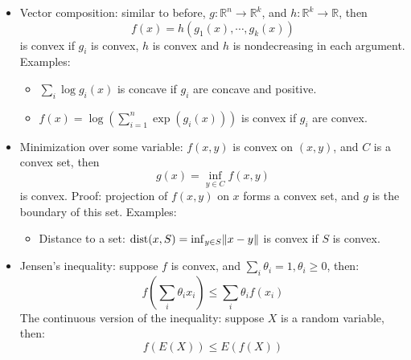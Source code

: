 \documentclass{report}
\begin{document}
\begin{itemize}
\item Vector composition: similar to before, $g: \mathbb{R}^n \rightarrow \mathbb{R}^k$, and $h: \mathbb{R}^k \rightarrow \mathbb{R}$, then
\begin{equation}
f(x) = h(g_1(x), \cdots, g_k(x))	
\end{equation}
is convex if $g_i$ is convex, $h$ is convex and $h$ is nondecreasing in each argument. Examples: 
\begin{itemize}
	\item $\sum_i \log g_i(x)$ is concave if $g_i$ are concave and positive. 
	\item $f(x) = \log \left( \sum_{i=1}^n \exp(g_i(x))\right)$ is convex if $g_i$ are convex. 
\end{itemize}

\item Minimization over some variable: $f(x,y)$ is convex on $(x,y)$, and $C$ is a convex set, then 
\begin{equation}
g(x) = \inf_{y \in C} f(x,y)
\end{equation}
is convex. Proof: projection of $f(x,y)$ on $x$ forms a convex set, and $g$ is the boundary of this set. Examples: 
\begin{itemize}
	\item Distance to a set: $\text{dist}(x, S) = \inf_{y \in S} \lVert x - y\rVert$ is convex if $S$ is convex. 
\end{itemize}

\item Jensen's inequality: suppose $f$ is convex, and $\sum_i \theta_i = 1, \theta_i \geq 0$, then: 
\begin{equation}
f\left( \sum_i \theta_i x_i \right) \leq \sum_i \theta_i f(x_i)	
\end{equation}
The continuous version of the inequality: suppose $X$ is a random variable, then: 
\begin{equation}
f(E(X)) \leq E(f(X))	
\end{equation}

\end{itemize}
\end{document}
